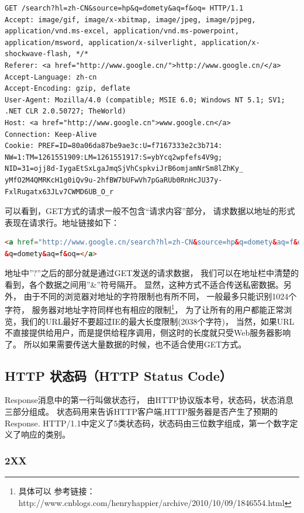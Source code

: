 \documentclass{book}
\begin{document}
\begin{lstlisting}
GET /search?hl=zh-CN&source=hp&q=domety&aq=f&oq= HTTP/1.1  
Accept: image/gif, image/x-xbitmap, image/jpeg, image/pjpeg, application/vnd.ms-excel, application/vnd.ms-powerpoint, 
application/msword, application/x-silverlight, application/x-shockwave-flash, */*  
Referer: <a href="http://www.google.cn/">http://www.google.cn/</a>  
Accept-Language: zh-cn  
Accept-Encoding: gzip, deflate  
User-Agent: Mozilla/4.0 (compatible; MSIE 6.0; Windows NT 5.1; SV1; .NET CLR 2.0.50727; TheWorld)  
Host: <a href="http://www.google.cn">www.google.cn</a>  
Connection: Keep-Alive  
Cookie: PREF=ID=80a06da87be9ae3c:U=f7167333e2c3b714:
NW=1:TM=1261551909:LM=1261551917:S=ybYcq2wpfefs4V9g; 
NID=31=ojj8d-IygaEtSxLgaJmqSjVhCspkviJrB6omjamNrSm8lZhKy_
yMfO2M4QMRKcH1g0iQv9u-2hfBW7bUFwVh7pGaRUb0RnHcJU37y-
FxlRugatx63JLv7CWMD6UB_O_r  
\end{lstlisting}

可以看到，GET方式的请求一般不包含“请求内容”部分，
请求数据以地址的形式表现在请求行。地址链接如下：

\begin{lstlisting}[language=HTML]
<a href="http://www.google.cn/search?hl=zh-CN&source=hp&q=domety&aq=f&oq=">http://www.google.cn/search?hl=zh-CN&source=hp
&q=domety&aq=f&oq=</a> 
\end{lstlisting}

地址中”?”之后的部分就是通过GET发送的请求数据，
我们可以在地址栏中清楚的看到，各个数据之间用”\&”符号隔开。
显然，这种方式不适合传送私密数据。另外，
由于不同的浏览器对地址的字符限制也有所不同，
一般最多只能识别1024个字符，
服务器对地址字符同样也有相应的限制\footnote{具体可以 参考链接：
http://www.cnblogs.com/henryhappier/archive/2010/10/09/1846554.html}，
为了让所有的用户都能正常浏览，我们的URL最好不要超过IE的最大长度限制(2038个字符)，
当然，如果URL不直接提供给用户，而是提供给程序调用，侧这时的长度就只受Web服务器影响了。
所以如果需要传送大量数据的时候，也不适合使用GET方式。

\subsection{HTTP 状态码（HTTP Status Code）}

Response消息中的第一行叫做状态行，
由HTTP协议版本号，状态码，状态消息三部分组成。
状态码用来告诉HTTP客户端,HTTP服务器是否产生了预期的Response.
HTTP/1.1中定义了5类状态码，状态码由三位数字组成，第一个数字定义了响应的类别。

\subsubsection{2XX}
\end{document}
